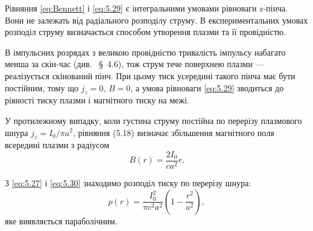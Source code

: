 \documentclass{article}
\begin{document}
Рівняння \eqref{eq:Bennett} і \eqref{eq:5.29} є інтегральними умовами рівноваги z-пінча. Вони не
залежать
від радіального розподілу струму. В експериментальних умовах розподіл струму визначається способом
утворення плазми та її провідністю.

В імпульсних розрядах з великою провідністю тривалість імпульсу набагато менша за скін-час (див.
~§~4.6), тож струм тече поверхнею плазми --- реалізується скінований пінч. При цьому тиск усередині
такого пінча має бути постійним, тому що \( j_z = 0 \), \( B = 0 \), а умова рівноваги
\eqref{eq:5.29} зводиться до рівності тиску плазми і магнітного тиску на межі.

У протилежному випадку, коли густина струму постійна по перерізу плазмового шнура \( j_z = I_0 / \pi
a^2 \), рівняння (5.18) визначає збільшення магнітного поля всередині плазми з радіусом
\begin{equation}\label{eq:5.30}
    B(r) = \frac{2I_0}{ca^2} r.
\end{equation}



З \eqref{eq:5.27} і \eqref{eq:5.30} знаходимо розподіл тиску по перерізу шнура:
\begin{equation}\label{eq:5.31}
    p(r) = \frac{I_0^2}{\pi c^2 a^2} \left( 1 - \frac{r^2}{a^2} \right),
\end{equation}
яке виявляється параболічним.
\end{document}
